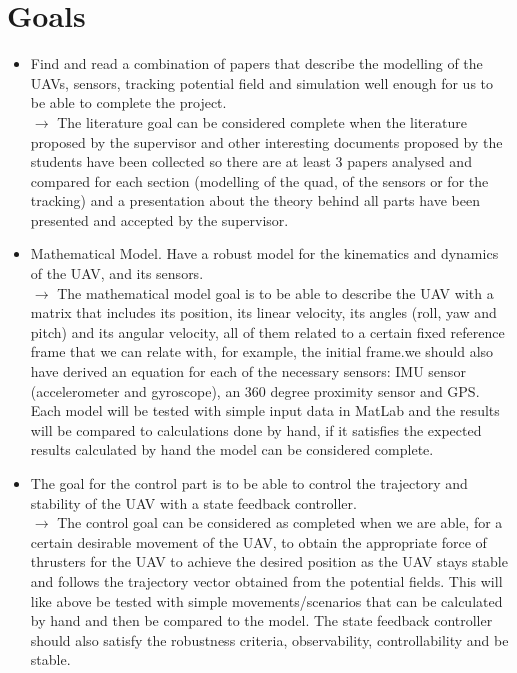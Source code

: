 \documentclass{article}
\begin{document}
	\section{Goals}	 
	\begin{itemize}
		\item Find and read a combination of papers that describe the modelling of the UAVs, sensors, tracking potential field and simulation well enough for us to be able to complete the project. \\  
		$\rightarrow$ The literature goal can be considered complete when the literature proposed by the supervisor and other interesting documents proposed by the students have been collected so there are at least 3 papers analysed and compared for each section (modelling of the quad, of the sensors or for the tracking) and a presentation about the theory behind all parts have been presented and accepted by the supervisor. %
	
		\item Mathematical Model. Have a robust model for the kinematics and dynamics of the UAV, and its sensors.\\
		$\rightarrow$ The mathematical model goal is to be able to describe the UAV with a matrix that includes its position, its linear velocity, its angles (roll, yaw and pitch) and its angular velocity, all of them related to a certain fixed reference frame that we can relate with, for example, the initial frame.we should also have derived an equation for each of the necessary sensors: IMU sensor (accelerometer and gyroscope), an 360 degree proximity sensor and GPS. Each model will be tested with simple input data in MatLab and the results will be compared to calculations done by hand, if it satisfies the expected results calculated by hand the model can be considered complete.
		
		\item The goal for the control part is to be able to control the trajectory and stability of the UAV with a state feedback controller. \\
		$\rightarrow$ The control goal can be considered as completed when we are able, for a certain desirable movement of the UAV, to obtain the appropriate force of thrusters for the UAV to achieve the desired position as the UAV stays stable and follows the trajectory vector obtained from the potential fields. This will like above be tested with simple movements/scenarios that can be calculated by hand and then be compared to the model. The state feedback controller should also satisfy the robustness criteria, observability, controllability and be stable.
		

\end{itemize}
\end{document}
